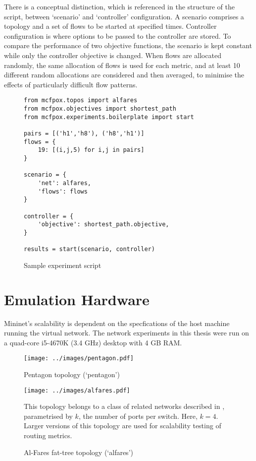 There is a conceptual distinction, which is referenced in the structure of the script, between `scenario' and `controller' configuration. A scenario comprises a topology and a set of flows to be started at specified times. Controller configuration is where options to be passed to the controller are stored. To compare the performance of two objective functions, the scenario is kept constant while only the controller objective is changed. When flows are allocated randomly, the same allocation of flows is used for each metric, and at least 10 different random allocations are considered and then averaged, to minimise the effects of particularly difficult flow patterns.

\begin{figure}
\begin{lstlisting}
from mcfpox.topos import alfares
from mcfpox.objectives import shortest_path
from mcfpox.experiments.boilerplate import start

pairs = [('h1','h8'), ('h8','h1')]
flows = {
    19: [(i,j,5) for i,j in pairs]
}

scenario = {
    'net': alfares,
    'flows': flows
}

controller = {
    'objective': shortest_path.objective,
}

results = start(scenario, controller)
\end{lstlisting}
\caption{Sample experiment script}
\label{fig:script}
\end{figure}

\section{Emulation Hardware}

Mininet's scalability is dependent on the specfications of the host machine running the virtual network. The network experiments in this thesis were run on a quad-core i5-4670K (3.4 GHz) desktop with 4 GB RAM. 

\begin{figure}
  \centering
  \texttt{[image: ../images/pentagon.pdf]}
  \caption{Pentagon topology (`pentagon')}
  \label{fig:pentagon}
  \vspace{2cm}
  \texttt{[image: ../images/alfares.pdf]}
  \caption{Al-Fares fat-tree topology (`alfares')}
  \label{fig:alfares}
  This topology belongs to a class of related networks described in \cite{alfares:fattree}, parametrised by $k$, the number of ports per switch. Here, $k=4$. Larger versions of this topology are used for scalability testing of routing metrics.
\end{figure}

